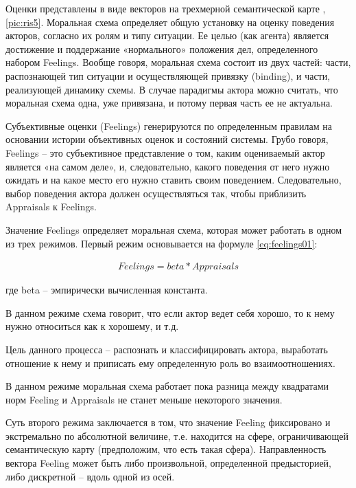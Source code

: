 Оценки представлены в виде векторов на трехмерной семантической карте \cite{seman_karta}, \ref{pic:ris5}.
Моральная схема определяет общую установку на оценку поведения акторов, согласно их ролям и типу ситуации. 
Ее целью (как агента) является достижение и поддержание «нормального» положения дел, определенного набором Feelings. 
Вообще говоря, моральная схема состоит из двух частей: части, распознающей тип ситуации и осуществляющей привязку (binding),
и части, реализующей динамику схемы. В случае парадигмы актора можно считать, что моральная схема одна, уже привязана, и 
потому первая часть ее не актуальна.

Субъективные оценки (Feelings) генерируются по определенным правилам на основании истории объективных оценок и состояний системы. 
Грубо говоря, Feelings – это субъективное представление о том, каким оцениваемый актор является «на самом деле», и, следовательно, 
какого поведения от него нужно ожидать и на какое место его нужно ставить своим поведением. Следовательно, выбор поведения актора 
должен осуществляться так, чтобы приблизить Appraisals к Feelings. 

Значение Feelings определяет моральная схема, которая может работать в одном из трех режимов. 
Первый режим основывается на формуле \ref{eq:feelings01}:

\begin{equation}
  \begin{gathered}
    Feelings=beta*Appraisals
  \end{gathered}
  \label{eq:feelings01}
\end{equation}

где beta – эмпирически вычисленная константа. 

В данном режиме схема говорит, что если актор ведет себя хорошо, то к нему нужно относиться как к хорошему, и т.д. 

Цель данного процесса – распознать и классифицировать актора, выработать отношение к нему и приписать ему определенную роль во взаимоотношениях. 

В данном режиме моральная схема работает пока разница между квадратами норм Feeling и Appraisals не станет меньше некоторого значения.

Суть второго режима заключается в том, что значение Feeling фиксировано и экстремально по абсолютной величине, т.е. находится на сфере, 
ограничивающей семантическую карту (предположим, что есть такая сфера). Направленность вектора Feeling может быть либо произвольной, 
определенной предысторией, либо дискретной – вдоль одной из осей.


